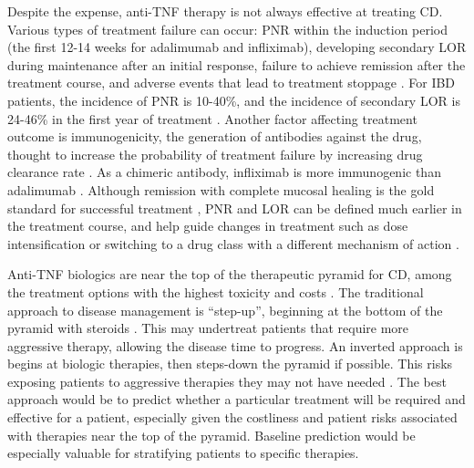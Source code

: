 Despite the expense, anti-\gls{TNF} therapy is not always effective at treating \gls{CD}.
Various types of treatment failure can occur:
\gls{PNR} within the induction period (the first 12-14 weeks for adalimumab and infliximab), developing secondary \gls{LOR} during maintenance after an initial response, failure to achieve remission after the treatment course, and adverse events that lead to treatment stoppage \autocite{roda2016LossResponseAntiTNFs}.
For \gls{IBD} patients, the incidence of \gls{PNR} is 10-40\%, and the incidence of secondary \gls{LOR} is 24-46\% in the first year of treatment \autocite{ben-horin2014OptimizingAntiTNFTreatments,flamant2018InflammatoryBowelDisease,kennedy2019PredictorsAntiTNFTreatment}.
Another factor affecting treatment outcome is immunogenicity, the generation of antibodies against the drug, 
thought to increase the probability of treatment failure by increasing drug clearance rate \autocite{lichtenstein2013ComprehensiveReviewAntitumor,kennedy2019PredictorsAntiTNFTreatment}.
As a chimeric antibody, infliximab is more immunogenic than adalimumab \autocite{vermeire2018ImmunogenicityBiologicsInflammatory,kennedy2019PredictorsAntiTNFTreatment}.
Although remission with complete mucosal healing is the gold standard for successful treatment \autocite{roda2020CrohnDisease}, \gls{PNR} and \gls{LOR} can be defined much earlier in the treatment course, and help guide changes in treatment such as dose intensification or switching to a drug class with a different mechanism of action \autocite{lichtenstein2013ComprehensiveReviewAntitumor,ben-horin2014OptimizingAntiTNFTreatments}.

Anti-\gls{TNF} biologics are near the top of the therapeutic pyramid for \gls{CD}, among the treatment options with the highest toxicity and costs \autocite{rogler2015WhereAreWe}.
The traditional approach to disease management is \enquote{step-up}, beginning at the bottom of the pyramid with steroids \autocite{adegbola2018AntiTNFTherapyCrohn}.
This may undertreat patients that require more aggressive therapy, allowing the disease time to progress.
An inverted approach is begins at biologic therapies, then steps-down the pyramid if possible.
This risks exposing patients to aggressive therapies they may not have needed \autocite{flamant2018InflammatoryBowelDisease}.
The best approach would be to predict whether a particular treatment will be required and effective for a patient, especially given the costliness and patient risks associated with therapies near the top of the pyramid.
Baseline prediction would be especially valuable for stratifying patients to specific therapies.

